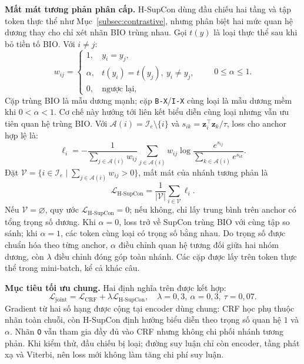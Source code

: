 \documentclass[conference,a4paper]{IEEEtran}
\begin{document}
\noindent\textbf{Mất mát tương phản phân cấp.} H-SupCon dùng đầu chiếu
hai tầng và tập token thực thể như Mục~\ref{subsec:contrastive}, nhưng
phân biệt hai mức quan hệ dương thay cho chỉ xét nhãn BIO trùng nhau. Gọi $t(y)$ là loại thực thể sau khi bỏ tiền tố BIO. Với $i\ne j$:
\begin{equation}
w_{ij}=\begin{cases}
1, & y_i=y_j,\\
\alpha, & t(y_i)=t(y_j),\ y_i\ne y_j,\\
0, & \text{ngược lại},
\end{cases}\qquad 0\le\alpha\le1.
\label{eq:weights}
\end{equation}
Cặp trùng BIO là mẫu dương mạnh; cặp \texttt{B-X}/\texttt{I-X} cùng
loại là mẫu dương mềm khi $0<\alpha<1$. Cơ chế này hướng tới liên kết
biểu diễn cùng loại nhưng vẫn ưu tiên quan hệ trùng BIO. Với
$\mathcal A(i)=\mathcal I_e\setminus\{i\}$ và
$s_{ik}=\mathbf z_i^\top\mathbf z_k/\tau$, loss cho anchor hợp lệ là:
\begin{equation}
\ell_i=-\frac{1}{\sum_{j\in\mathcal A(i)}w_{ij}}
\sum_{j\in\mathcal A(i)}w_{ij}
\log\frac{e^{s_{ij}}}{\sum_{k\in\mathcal A(i)}e^{s_{ik}}}.
\label{eq:hsupcon-anchor}
\end{equation}
Đặt $\mathcal V=\{i\in\mathcal I_e\mid
\sum_{j\in\mathcal A(i)}w_{ij}>0\}$, mất mát của nhánh tương phản là
\begin{equation}
\mathcal L_{\mathrm{H\text{-}SupCon}}
=\frac{1}{|\mathcal V|}\sum_{i\in\mathcal V}\ell_i.
\label{eq:hsupcon-loss}
\end{equation}
Nếu $\mathcal V=\varnothing$, quy ước $\mathcal L_{\mathrm{H\text{-}SupCon}}=0$;
nếu không, chỉ lấy trung bình trên anchor có tổng trọng số dương.
Khi $\alpha=0$, loss trở về SupCon trùng BIO với cùng tập so sánh;
khi $\alpha=1$, các token cùng loại có trọng số bằng nhau. Do trọng số
được chuẩn hóa theo từng anchor, $\alpha$ điều chỉnh quan hệ tương đối
giữa hai nhóm dương, còn $\lambda$ điều chỉnh đóng góp toàn nhánh.
Các cặp được lấy trên token thực thể trong mini-batch, kể cả khác câu.

\noindent\textbf{Mục tiêu tối ưu chung.} Hai định nghĩa trên được kết hợp:
\begin{equation}
\mathcal L_{\mathrm{joint}}=\mathcal L_{\mathrm{CRF}}+
\lambda\mathcal L_{\mathrm{H\text{-}SupCon}},
\quad \lambda=0{,}3,\ \alpha=0{,}3,\ \tau=0{,}07.
\label{eq:joint-loss}
\end{equation}
Gradient từ hai số hạng được cộng tại encoder dùng chung: CRF học
phụ thuộc nhãn toàn chuỗi, còn H-SupCon định hướng biểu diễn theo
trọng số quan hệ $1$ và $\alpha$. Nhãn \texttt{O}
vẫn tham gia đầy đủ vào CRF nhưng không chi phối nhánh tương phản. Khi
kiểm thử, đầu chiếu bị loại; đường suy luận chỉ còn encoder, tầng phát xạ
và Viterbi, nên loss mới không làm tăng chi phí suy luận.
\end{document}
